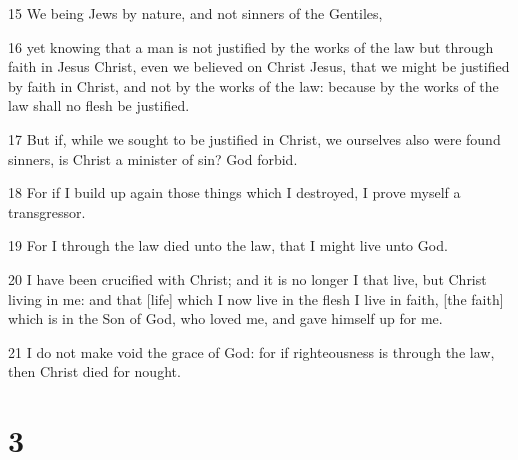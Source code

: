 \par 15 We being Jews by nature, and not sinners of the Gentiles,
\par 16 yet knowing that a man is not justified by the works of the law but through faith in Jesus Christ, even we believed on Christ Jesus, that we might be justified by faith in Christ, and not by the works of the law: because by the works of the law shall no flesh be justified.
\par 17 But if, while we sought to be justified in Christ, we ourselves also were found sinners, is Christ a minister of sin? God forbid.
\par 18 For if I build up again those things which I destroyed, I prove myself a transgressor.
\par 19 For I through the law died unto the law, that I might live unto God.
\par 20 I have been crucified with Christ; and it is no longer I that live, but Christ living in me: and that [life] which I now live in the flesh I live in faith, [the faith] which is in the Son of God, who loved me, and gave himself up for me.
\par 21 I do not make void the grace of God: for if righteousness is through the law, then Christ died for nought.

\chapter{3}

